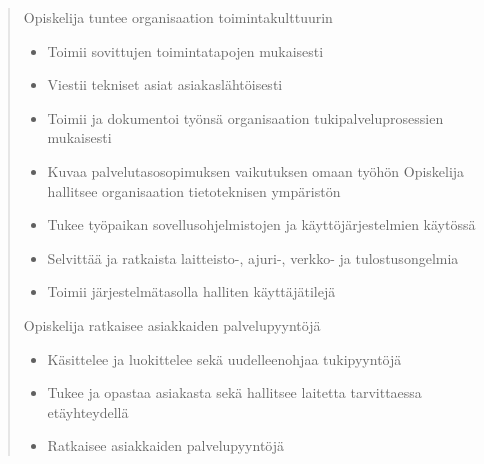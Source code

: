 \documentclass[../wifi-security.tex]{subfiles}
\begin{document}
\begin{quote}
Opiskelija tuntee organisaation toimintakulttuurin
\begin{itemize}
\item Toimii sovittujen toimintatapojen mukaisesti
\item Viestii tekniset asiat asiakaslähtöisesti
\item Toimii ja dokumentoi työnsä organisaation tukipalveluprosessien mukaisesti
\item Kuvaa palvelutasosopimuksen vaikutuksen omaan työhön
Opiskelija hallitsee organisaation tietoteknisen ympäristön
\item Tukee työpaikan sovellusohjelmistojen ja käyttöjärjestelmien käytössä
\item Selvittää ja ratkaista laitteisto-, ajuri-, verkko- ja tulostusongelmia
\item Toimii järjestelmätasolla halliten käyttäjätilejä
\end{itemize}
Opiskelija ratkaisee asiakkaiden palvelupyyntöjä
\begin{itemize}
\item Käsittelee ja luokittelee sekä uudelleenohjaa tukipyyntöjä
\item Tukee ja opastaa asiakasta sekä hallitsee laitetta tarvittaessa etäyhteydellä
\item Ratkaisee asiakkaiden palvelupyyntöjä
\end{itemize}
\end{quote}




\end{document}
